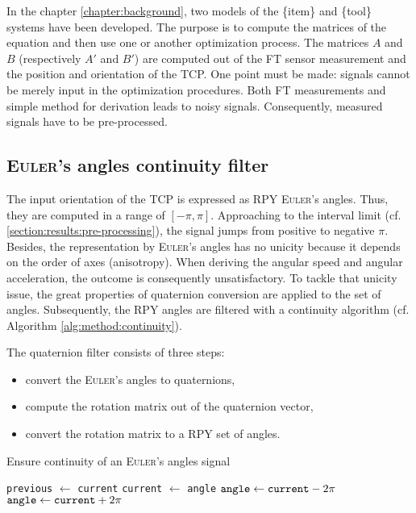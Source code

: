 \documentclass[/home/francois/latex/report/main.tex]{subfiles}
\begin{document}
In the chapter \ref{chapter:background}, two models of the \{item\} and \{tool\} systems have been developed. The purpose is to compute the matrices of the equation and then use one or another optimization process. The matrices $A$ and $B$ (respectively $A'$ and $B'$) are computed out of the \ac{FT} sensor measurement and the position and orientation of the \ac{TCP}. One point must be made: signals cannot be merely input in the optimization procedures. Both \ac{FT} measurements and simple method for derivation leads to noisy signals. Consequently, measured signals have to be pre-processed.

\subsection{\textsc{Euler}'s angles continuity filter}
\label{subsection:method:euler-filter}

The input orientation of the \ac{TCP} is expressed as \ac{RPY} \textsc{Euler}'s angles. Thus, they are computed in a range of $[-\pi, \pi]$. Approaching to the interval limit (cf. \ref{section:results:pre-processing}), the signal jumps from positive to negative $\pi$. Besides, the representation by \textsc{Euler}'s angles has no unicity because it depends on the order of axes (anisotropy). When deriving the angular speed and angular acceleration, the outcome is consequently unsatisfactory. To tackle that unicity issue, the great properties of quaternion conversion are applied to the set of angles. Subsequently, the \ac{RPY} angles are filtered with a continuity algorithm (cf. Algorithm \ref{alg:method:continuity}).

The quaternion filter consists of three steps:

\begin{itemize}
  \item convert the \textsc{Euler}'s angles to quaternions,
  \item compute the rotation matrix out of the quaternion vector,
  \item convert the rotation matrix to a \ac{RPY} set of angles.
\end{itemize}

\begin{algorithm}
\caption{Ensure continuity of an \textsc{Euler}'s angles signal \label{alg:method:continuity}}
\begin{algorithmic}
  \STATE \texttt{previous}  $\leftarrow$ \texttt{current}
  \STATE \texttt{current}  $\leftarrow$ \texttt{angle}
    \STATE $\text{\texttt{angle}} \leftarrow \text{\texttt{current}} - 2 \pi$
   \ELSE
    \STATE $\text{\texttt{angle}} \leftarrow \text{\texttt{current}} + 2 \pi$
   \ENDIF
  \ENDIF
 \ENDFOR
\ENDFOR
\end{algorithmic}
\end{algorithm}
\end{document}
